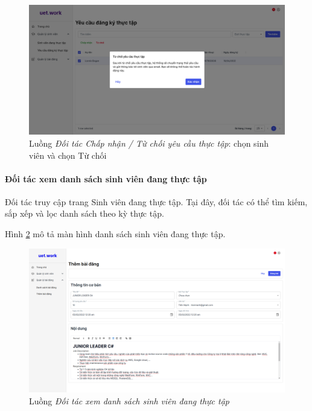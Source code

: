 \documentclass[./../main.tex]{subfiles}
\begin{document}
\begin{figure}[]
	\includegraphics[width=\linewidth]{./images/image67.png}
	\caption{Luồng \emph{Đối tác Chấp nhận / Từ chối yêu cầu thực tập}: chọn sinh viên và chọn Từ chối}
	\label{fig:partner_select_students_reject}
\end{figure}

\paragraph*{Đối tác xem danh sách sinh viên đang thực tập}

Đối tác truy cập trang Sinh viên đang thực tập. Tại đây, đối tác có thể tìm kiếm, sắp xếp và lọc danh sách theo kỳ thực tập.

Hình \ref{fig:partner_view_list_working_students_page} mô tả màn hình danh sách sinh viên đang thực tập.

\begin{figure}[]
	\includegraphics[width=\linewidth]{./images/image18.png} %
	\caption{Luồng \emph{Đối tác xem danh sách sinh viên đang thực tập}}
	\label{fig:partner_view_list_working_students_page}
\end{figure}
\end{document}
